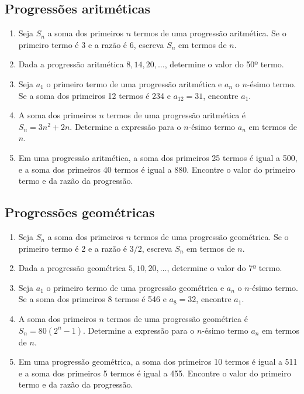 \documentclass{article}
\begin{document}
\subsection{Progressões aritméticas}

\begin{enumerate}

    \item  Seja \(S_n\) a soma dos primeiros \(n\) termos de uma progressão aritmética. Se o primeiro termo é 3 e a razão é 6, escreva \(S_n\) em termos de \(n\).
    
    \item  Dada a progressão aritmética \(8, 14, 20, \ldots\), determine o valor do 50º termo.
    
    \item  Seja \(a_1\) o primeiro termo de uma progressão aritmética e \(a_n\) o \(n\)-ésimo termo. Se a soma dos primeiros 12 termos é 234 e \(a_{12} = 31\), encontre \(a_1\).
    
    \item  A soma dos primeiros \(n\) termos de uma progressão aritmética é \(S_n = 3n^2 + 2n\). Determine a expressão para o \(n\)-ésimo termo \(a_n\) em termos de \(n\).
    
    \item  Em uma progressão aritmética, a soma dos primeiros 25 termos é igual a 500, e a soma dos primeiros 40 termos é igual a 880. Encontre o valor do primeiro termo e da razão da progressão.
    
\end{enumerate}

\subsection{Progressões geométricas}

\begin{enumerate}
    \item Seja \(S_n\) a soma dos primeiros \(n\) termos de uma progressão geométrica. Se o primeiro termo é 2 e a razão é \(3/2\), escreva \(S_n\) em termos de \(n\).
    
    \item  Dada a progressão geométrica \(5, 10, 20, \ldots\), determine o valor do 7º termo.
    
    \item  Seja \(a_1\) o primeiro termo de uma progressão geométrica e \(a_n\) o \(n\)-ésimo termo. Se a soma dos primeiros 8 termos é 546 e \(a_{8} = 32\), encontre \(a_1\).
    
    \item  A soma dos primeiros \(n\) termos de uma progressão geométrica é \(S_n = 80(2^n - 1)\). Determine a expressão para o \(n\)-ésimo termo \(a_n\) em termos de \(n\).
    
    \item  Em uma progressão geométrica, a soma dos primeiros 10 termos é igual a 511 e a soma dos primeiros 5 termos é igual a 455. Encontre o valor do primeiro termo e da razão da progressão.
    
\end{enumerate}


%
%
\end{document}

